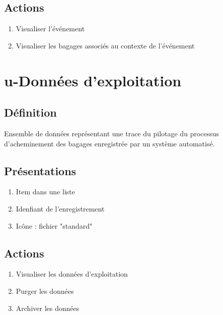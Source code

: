 \subsection{Actions}
\begin{enumerate}
	\item Visualiser l'événement
	\item Visualiser les bagages associés au contexte de l'événement
\end{enumerate}

\section{u-Données d'exploitation}
\subsection{Définition}
	Ensemble de données représentant une trace du pilotage du processus d'acheminement des bagages enregistrée par un
	système automatisé.

\subsection{Présentations}
\begin{enumerate}
	\item Item dans une liste
	\item Idenfiant de l'enregistrement
	\item Icône : fichier "standard"
\end{enumerate}

\subsection{Actions}
\begin{enumerate}
	\item Visualiser les données d'exploitation
	\item Purger les données
	\item Archiver les données
\end{enumerate}
